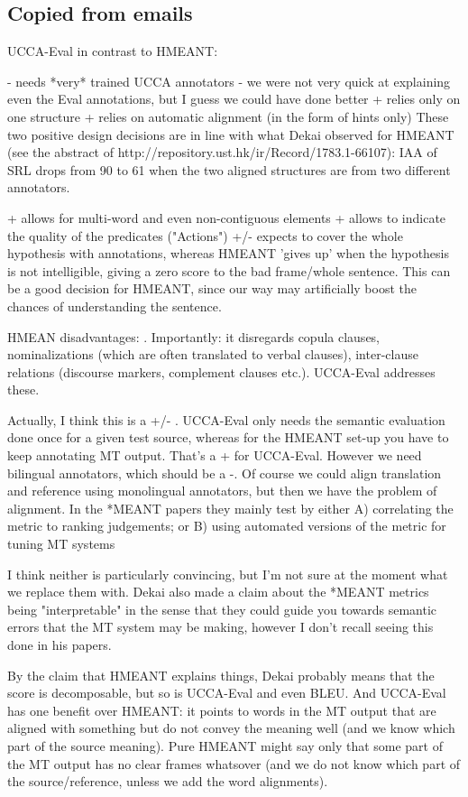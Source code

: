 \documentclass[11pt]{article}
\begin{document}
\subsection{Copied from emails}


UCCA-Eval in contrast to HMEANT:

- needs *very* trained UCCA annotators
- we were not very quick at explaining even the Eval annotations, but I guess we could have done better
+ relies only on one structure
+ relies on automatic alignment (in the form of hints only)
  These two positive design decisions are in line with what Dekai observed for HMEANT (see the abstract of http://repository.ust.hk/ir/Record/1783.1-66107): IAA of SRL drops from 90 to 61 when the two aligned structures are from two different annotators.

+ allows for multi-word and even non-contiguous elements
+ allows to indicate the quality of the predicates ("Actions")
+/- expects to cover the whole hypothesis with annotations, whereas HMEANT 'gives up' when the hypothesis is not intelligible, giving a zero score to the bad frame/whole sentence. This can be a good decision for HMEANT, since our way may artificially boost the chances of understanding the sentence.


HMEAN disadvantages:
. Importantly: it disregards copula clauses, nominalizations (which are often translated to verbal clauses), inter-clause relations (discourse markers, complement clauses etc.). UCCA-Eval addresses these.

Actually, I think this is a +/- . UCCA-Eval only needs the semantic evaluation done once for a given test source, whereas for the HMEANT set-up you have to keep annotating MT output. That's a + for UCCA-Eval. However we need bilingual annotators, which should be a -. Of course we could align translation and reference using monolingual annotators, but then we have the problem of alignment.
In the *MEANT papers they mainly test by either
A) correlating the metric to ranking judgements; or
B) using automated versions of the metric for tuning MT systems

I think neither is particularly convincing, but I'm not sure at the moment what we replace them with. Dekai also made a claim about the *MEANT metrics being "interpretable" in the sense that they could guide you towards semantic errors that the MT system may be making, however I don't recall seeing this done in his papers. 


By the claim that HMEANT explains things, Dekai probably means that the score is decomposable, but so is UCCA-Eval and even BLEU. And UCCA-Eval has one benefit over HMEANT: it points to words in the MT output that are aligned with something but do not convey the meaning well (and we know which part of the source meaning). Pure HMEANT might say only that some part of the MT output has no clear frames whatsover (and we do not know which part of the source/reference, unless we add the word alignments).
\end{document}
